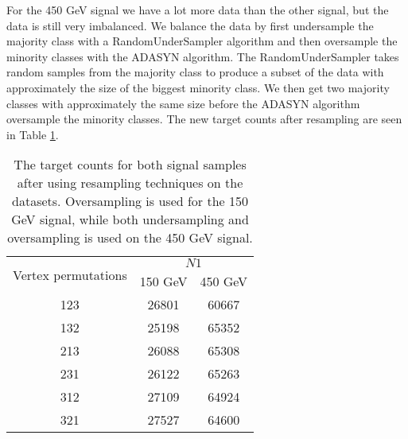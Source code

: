 \documentclass[a4paper, american, 12pt]{report}
\begin{document}
	For the 450 GeV signal we have a lot more data than the other signal, but the data is still very imbalanced. We balance the data by first undersample the majority class with a RandomUnderSampler algorithm and then oversample the minority classes with the ADASYN algorithm. The RandomUnderSampler takes random samples from the majority class to produce a subset of the data with approximately the size of the biggest minority class. We then get two majority classes with approximately the same size before the ADASYN algorithm oversample the minority classes. The new target counts after resampling are seen in Table \ref{tab:Counts_resample}.
	\begin{table}[htbp!]
		\centering
		\begin{tabular}{ |c|c|c| }
			\hline
			\multirow{2}{*}{Vertex permutations} & \multicolumn{2}{|c|}{$N1$}\\
			\cline{2-3} \rule{0pt}{13pt}
			 & 150 GeV & 450 GeV  \\
			\hline \rule{0pt}{13pt}
			123 & 26801 & 60667 \\
			\hline \rule{0pt}{13pt}
			132 & 25198 & 65352 \\
			\hline \rule{0pt}{13pt}
			213 & 26088 & 65308 \\
			\hline \rule{0pt}{13pt}
			231 & 26122 & 65263 \\
			\hline \rule{0pt}{13pt}
			312 & 27109 & 64924 \\
			\hline \rule{0pt}{13pt}
			321 & 27527 & 64600 \\
			\hline
		\end{tabular}	
		\caption[Target counts after resampling.]{The target counts for both signal samples after using resampling techniques on the datasets. Oversampling is used for the 150 GeV signal, while both undersampling and oversampling is used on the 450 GeV signal.}
		\label{tab:Counts_resample}
	\end{table}
\end{document}
